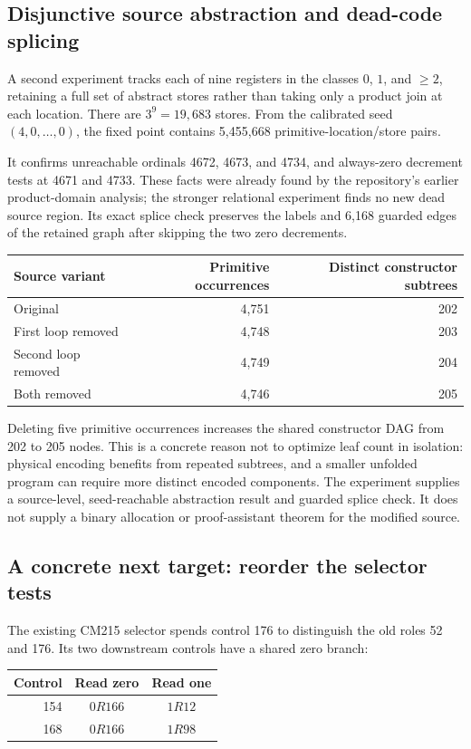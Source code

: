 \documentclass[11pt]{article}
\begin{document}
\subsection{Disjunctive source abstraction and dead-code splicing}

A second experiment tracks each of nine registers in the classes $0$, $1$, and $\geq2$, retaining a full set of abstract stores rather than taking only a product join at each location. There are $3^9=19,683$ stores. From the calibrated seed $(4,0,\ldots,0)$, the fixed point contains 5,455,668 primitive-location/store pairs.

It confirms unreachable ordinals 4672, 4673, and 4734, and always-zero decrement tests at 4671 and 4733. These facts were already found by the repository's earlier product-domain analysis; the stronger relational experiment finds no new dead source region. Its exact splice check preserves the labels and 6,168 guarded edges of the retained graph after skipping the two zero decrements.

\begin{center}
\begin{tabular}{@{}lrr@{}}
\toprule
Source variant & Primitive occurrences & Distinct constructor subtrees \\
\midrule
Original & 4,751 & 202 \\
First loop removed & 4,748 & 203 \\
Second loop removed & 4,749 & 204 \\
Both removed & 4,746 & 205 \\
\bottomrule
\end{tabular}
\end{center}

Deleting five primitive occurrences increases the shared constructor DAG from 202 to 205 nodes. This is a concrete reason not to optimize leaf count in isolation: physical encoding benefits from repeated subtrees, and a smaller unfolded program can require more distinct encoded components. The experiment supplies a source-level, seed-reachable abstraction result and guarded splice check. It does not supply a binary allocation or proof-assistant theorem for the modified source.

\subsection{A concrete next target: reorder the selector tests}

The existing CM215 selector spends control 176 to distinguish the old roles 52 and 176. Its two downstream controls have a shared zero branch:
\begin{center}
\begin{tabular}{@{}rcc@{}}
\toprule
Control & Read zero & Read one \\
\midrule
154 & $0R166$ & $1R12$ \\
168 & $0R166$ & $1R98$ \\
\bottomrule
\end{tabular}
\end{center}
\end{document}

